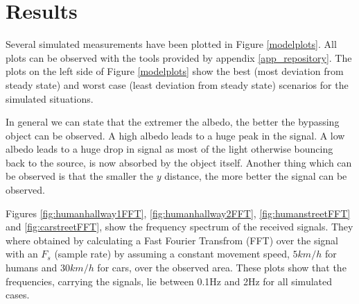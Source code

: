 \section{Results}
Several simulated measurements have been plotted in Figure \ref{modelplots}.  All plots can be observed with the tools provided by appendix \ref{app_repository}. The plots on the left side of Figure \ref{modelplots} show the best (most deviation from steady state) and worst case (least deviation from steady state) scenarios for the simulated situations. 

In general we can state that the extremer the albedo, the better the bypassing object can be observed. A high albedo leads to a huge peak in the signal. A low albedo leads to a huge drop in signal as most of the light otherwise bouncing back to the source, is now absorbed by the object itself. Another thing which can be observed is that the smaller the $y$ distance, the more better the signal can be observed.

Figures \ref{fig:humanhallway1FFT}, \ref{fig:humanhallway2FFT}, \ref{fig:humanstreetFFT} and \ref{fig:carstreetFFT}, show the frequency spectrum of the received signals. They where obtained by calculating a Fast Fourier Transfrom (FFT) over the signal with an $F_s$ (sample rate) by assuming a constant movement speed, $5km/h$ for humans and $30km/h$ for cars, over the observed area. These plots show that the frequencies, carrying the signals, lie between 0.1Hz and 2Hz for all simulated cases.

